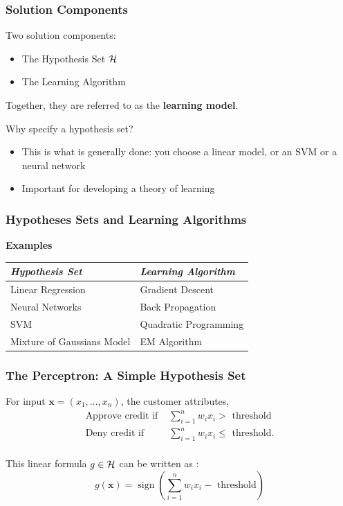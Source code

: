 \documentclass[xcolor=table]{beamer}
\newcommand{\vect}[1]{\ensuremath{\mathbf{#1}}}
\DeclareMathOperator{\sign}{sign}
\begin{document}
\begin{frame}[t]
\frametitle{Solution Components}
Two solution components:
\begin{itemize}
    \item The Hypothesis Set $\cal{H}$
    \item The Learning Algorithm
\end{itemize}

Together, they are referred to as the \textbf{learning model}.

\pause

\bigskip

Why specify a hypothesis set?
\begin{itemize}
    \item This is what is generally done: you choose a linear model, 
    or an SVM or a neural network

    \item Important for developing a theory of learning 
\end{itemize}
\end{frame}

\begin{frame}[t]
\frametitle{Hypotheses Sets and Learning Algorithms}
\textbf{Examples}

\begin{center}
\begin{tabular}{ll}
\emph{Hypothesis Set} & \emph{Learning Algorithm} \\ \hline
Linear Regression & Gradient Descent \\
Neural Networks & Back Propagation \\
SVM & Quadratic Programming \\
Mixture of Gaussians Model & EM Algorithm \\
\end{tabular}
\end{center}
\end{frame}

\begin{frame}[t]
\frametitle{The Perceptron: A Simple Hypothesis Set}
For input $\vect{x} = (x_1, \ldots, x_n)$, the customer attributes,
\begin{align*}
\text{Approve credit if } & \sum_{i = 1}^{n} w_i x_i >    \text{ threshold} \\
\text{Deny credit if }    & \sum_{i = 1}^{n} w_i x_i \leq \text{ threshold}. \\
\end{align*}

This linear formula $g \in \cal{H}$ can be written as :
\[
    g(\vect{x}) = \sign \left (\sum_{i=1}^{n} w_i x_i - \text{ threshold} \right )
\]
\end{frame}
\end{document}
